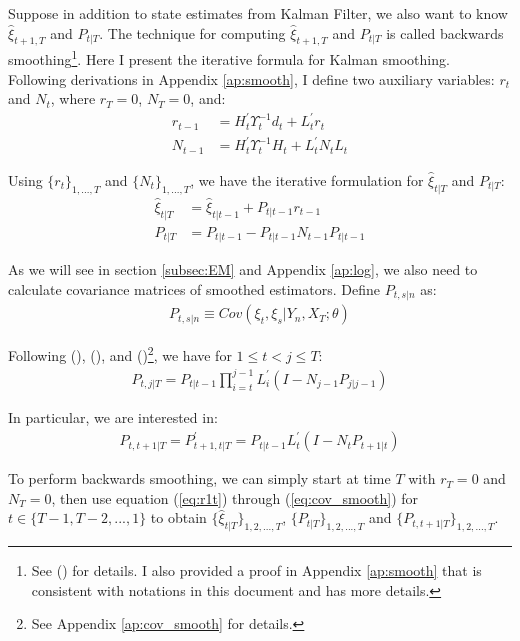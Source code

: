 \documentclass[10pt]{article}
\numberwithin{equation}{section}
\begin{document}
Suppose in addition to state estimates from Kalman Filter, we also want to know $\hat{\xi}_{t+1,T}$ and $P_{t|T}$. The technique for computing $\hat{\xi}_{t+1,T}$ and $P_{t|T}$ is called backwards smoothing\footnote{See (\cite{dejong_1989}) for details. I also provided a proof in Appendix \ref{ap:smooth} that is consistent with notations in this document and has more details.}. Here I present the iterative formula for Kalman smoothing. Following derivations in Appendix \ref{ap:smooth}, I define two auxiliary variables: $r_{t}$ and $N_{t}$, where $r_T=0$, $N_T=0$, and:
\begin{align}
    r_{t-1} &= H_t^{'}\Upsilon_t^{-1}d_t + L_t^{'}r_t \label{eq:r1t} \\
    N_{t-1} &= H_t^{'}\Upsilon_t^{-1}H_t + L_t^{'}N_tL_t \label{eq:N1t}
\end{align}

Using $\{r_t\}_{1,...,T}$ and $\{N_t\}_{1,...,T}$, we have the iterative formulation for $\hat{\xi}_{t|T}$ and $P_{t|T}$:
\begin{align}
    \hat{\xi}_{t|T} &= \hat{\xi}_{t|t-1} + P_{t|t-1}r_{t-1} \label{eq:smooth_state2} \\
    P_{t|T} &= P_{t|t-1}- P_{t|t-1}N_{t-1}P_{t|t-1} \label{eq:smooth_P2}
\end{align}

As we will see in section \ref{subsec:EM} and Appendix \ref{ap:log}, we also need to calculate covariance matrices of smoothed estimators. Define $P_{t,s|n}$ as:
\begin{align*}
    P_{t,s|n}\equiv Cov(\xi_t,\xi_{s}|Y_n,X_T;\theta)
\end{align*}

Following (\cite{koopman_1992}), (\cite{dejong_1988}), and (\cite{dejong_1989})\footnote{See Appendix \ref{ap:cov_smooth} for details.}, we have for $1\leq t < j \leq T$:
\begin{align*}
    P_{t,j|T} = P_{t|t-1}\prod_{i=t}^{j-1}L_i^{'}(I-N_{j-1}P_{j|j-1}) 
\end{align*}

In particular, we are interested in:
\begin{align}
    P_{t,t+1|T} = P_{t+1,t|T}^{'} = P_{t|t-1}L_t^{'}(I-N_tP_{t+1|t}) \label{eq:cov_smooth}
\end{align}

To perform backwards smoothing, we can simply start at time $T$ with $r_T=0$ and $N_T=0$, then use equation (\ref{eq:r1t}) through (\ref{eq:cov_smooth}) for $t\in\{T-1,T-2,...,1\}$ to obtain $\{\hat{\xi}_{t|T}\}_{1,2,...,T}$, $\{P_{t|T}\}_{1,2,...,T}$ and $\{P_{t,t+1|T}\}_{1,2,...,T}$.
\end{document}
